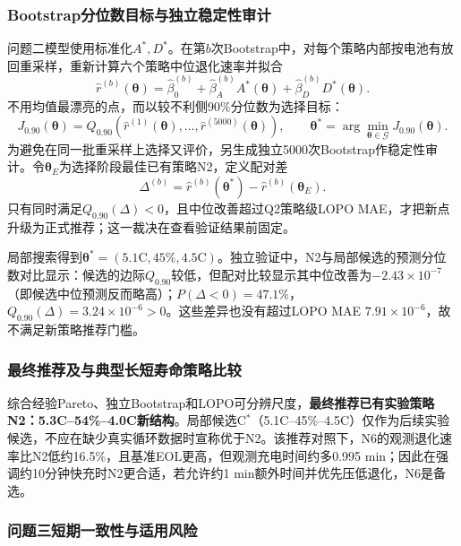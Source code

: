 \documentclass[withoutpreface]{cumcmthesis}
\newcommand{\paperstrong}[1]{\textbf{#1}}
\begin{document}
\subsubsection{Bootstrap分位数目标与独立稳定性审计}

问题二模型使用标准化$A^*,D^*$。在第$b$次Bootstrap中，对每个策略内部按电池有放回重采样，重新计算六个策略中位退化速率并拟合
\begin{equation}
\widehat r^{(b)}(\boldsymbol\theta)
=\widehat\beta_0^{(b)}+
\widehat\beta_A^{(b)}A^*(\boldsymbol\theta)+
\widehat\beta_D^{(b)}D^*(\boldsymbol\theta).
\end{equation}
不用均值最漂亮的点，而以较不利侧90\%分位数为选择目标：
\begin{equation}
J_{0.90}(\boldsymbol\theta)
=Q_{0.90}\left(\widehat r^{(1)}(\boldsymbol\theta),\ldots,
\widehat r^{(5000)}(\boldsymbol\theta)\right),
\qquad
\boldsymbol\theta^*=\arg\min_{\boldsymbol\theta\in\mathcal G}J_{0.90}(\boldsymbol\theta).
\end{equation}
为避免在同一批重采样上选择又评价，另生成独立5000次Bootstrap作稳定性审计。令$\boldsymbol\theta_E$为选择阶段最佳已有策略N2，定义配对差
\begin{equation}
\Delta^{(b)}=\widehat r^{(b)}(\boldsymbol\theta^*)-
\widehat r^{(b)}(\boldsymbol\theta_E).
\end{equation}
只有同时满足$Q_{0.90}(\Delta)<0$，且中位改善超过Q2策略级LOPO MAE，才把新点升级为正式推荐；这一裁决在查看验证结果前固定。

局部搜索得到$\boldsymbol\theta^*=(5.1\mathrm C,45\%,4.5\mathrm C)$。独立验证中，N2与局部候选的预测分位数对比显示：候选的边际$Q_{0.90}$较低，但配对比较显示其中位改善为$-2.43\times10^{-7}$（即候选中位预测反而略高）；$P(\Delta<0)=47.1\%$，$Q_{0.90}(\Delta)=3.24\times10^{-6}>0$。这些差异也没有超过LOPO MAE $7.91\times10^{-6}$，故不满足新策略推荐门槛。

\subsubsection{最终推荐及与典型长短寿命策略比较}

综合经验Pareto、独立Bootstrap和LOPO可分辨尺度，\paperstrong{最终推荐已有实验策略N2：5.3C--54\%--4.0C新结构}。局部候选C$^*$（5.1C--45\%--4.5C）仅作为后续实验候选，不应在缺少真实循环数据时宣称优于N2。该推荐对照下，N6的观测退化速率比N2低约16.5\%，且基准EOL更高，但观测充电时间约多0.995 min；因此在强调约10分钟快充时N2更合适，若允许约1 min额外时间并优先压低退化，N6是备选。

\subsubsection{问题三短期一致性与适用风险}
\end{document}
